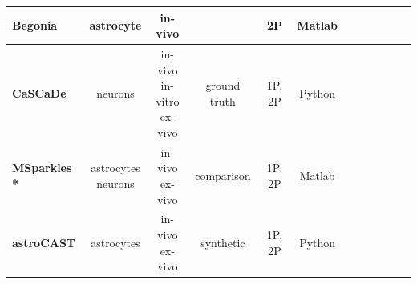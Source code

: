 \documentclass[utf8]{FrontiersinHarvard}
\newcommand{\cmark}{\ding{51}} %
\newcommand{\xmark}{\textemdash} %
\begin{document}
\begin{table}[htb]
\begin{tabular}{|l|c|c|c|c|c|c|c|c|c|c|c|}
            \hline \textbf{Begonia\citep{bjornstad_begoniatwo-photon_2021}} & astrocyte & in-vivo & \xmark & 2P & Matlab & \cmark & \cmark \\
            \hline \textbf{CaSCaDe\citep{rupprecht_database_2021}} & neurons & \makecell{in-vivo \\in-vitro \\ex-vivo} & ground truth & 1P, 2P & Python & \cmark & \xmark \\
            \hline \textbf{MSparkles\citep{stopper_novel_2022} *} & \makecell{astrocytes \\neurons} & \makecell{in-vivo \\ex-vivo} & comparison & 1P, 2P & Matlab & \xmark & \cmark \\
            \hline \textbf{astroCAST} & astrocytes & \makecell{in-vivo \\ex-vivo} & synthetic & 1P, 2P & Python & \cmark & \cmark \\
            \hline
        \end{tabular}
    \end{table}
    \egroup

\end{document}
